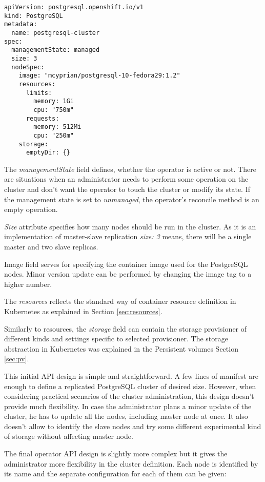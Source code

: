 \documentclass[
  digital, %
  twoside, %
  table,   %
  lof,     %
  lot,     %
]{fithesis3}
\begin{document}
\begin{lstlisting}
apiVersion: postgresql.openshift.io/v1
kind: PostgreSQL
metadata:
  name: postgresql-cluster
spec:
  managementState: managed
  size: 3
  nodeSpec:
    image: "mcyprian/postgresql-10-fedora29:1.2"
    resources:
      limits:
        memory: 1Gi
        cpu: "750m"
      requests:
        memory: 512Mi
        cpu: "250m"
    storage:
      emptyDir: {}
\end{lstlisting}

The \textit{managementState} field defines, whether the operator is active or not. There are situations when an administrator needs to perform some operation on the cluster and don't want the operator to touch the cluster or modify its state. If the management state is set to \textit{unmanaged}, the operator’s reconcile method is an empty operation.

\textit{Size} attribute specifies how many nodes should be run in the cluster. As it is an implementation of master-slave replication \textit{size: 3} means, there will be a single master and two slave replicas.

Image field serves for specifying the container image used for the PostgreSQL nodes. Minor version update can be performed by changing the image tag to a higher number.

The \textit{resources} reflects the standard way of container resource definition in Kubernetes as explained in Section \ref{sec:resources}.

Similarly to resources, the \textit{storage} field can contain the storage provisioner of different kinds and settings specific to selected provisioner. The storage abstraction in Kubernetes was explained in the Persistent volumes Section \ref{sec:pv}.

This initial API design is simple and straightforward. A few lines of manifest are enough to define a replicated PostgreSQL cluster of desired size. However, when considering practical scenarios of the cluster administration, this design doesn't provide much flexibility. In case the administrator plans a minor update of the cluster, he has to update all the nodes, including master node at once. It also doesn't allow to identify the slave nodes and try some different experimental kind of storage without affecting master node.

The final operator API design is slightly more complex but it gives the administrator more flexibility in the cluster definition. Each node is identified by its name and the separate configuration for each of them can be given:
\end{document}

